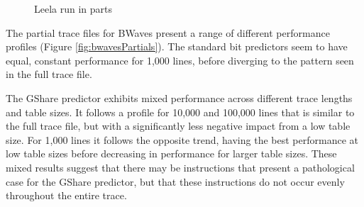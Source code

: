 \begin{figure}[htbp]
{
        \label{fig:leelaPartials4}
    }
    \caption{Leela run in parts}
    \label{fig:leelaPartials}
\end{figure}

\clearpage
The partial trace files for BWaves present a range of different performance profiles (Figure \ref{fig:bwavesPartials}). The standard bit predictors seem to have equal, constant performance for 1,000 lines, before diverging to the pattern seen in the full trace file.

The GShare predictor exhibits mixed performance across different trace lengths and table sizes. It follows a profile for 10,000 and 100,000 lines that is similar to the full trace file, but with a significantly less negative impact from a low table size. For 1,000 lines it follows the opposite trend, having the best performance at low table sizes before decreasing in performance for larger table sizes. These mixed results suggest that there may be instructions that present a pathological case for the GShare predictor, but that these instructions do not occur evenly throughout the entire trace.

